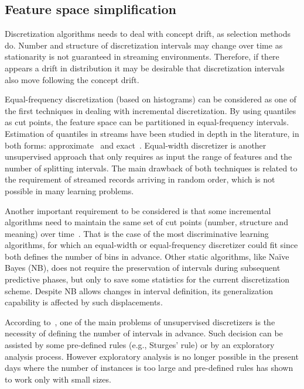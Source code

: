 \documentclass[preprint,12pt]{elsarticle}
\begin{document}
\subsection{Feature space simplification}
\label{subsec:disc}

Discretization algorithms needs to deal with concept drift, as selection methods do. Number and structure of discretization intervals may change over time as stationarity is not guaranteed in streaming environments. Therefore, if there appears a drift in distribution it may be desirable that discretization intervals also move following the concept drift.

Equal-frequency discretization (based on histograms) can be considered as one of the first techniques in dealing with incremental discretization. By using quantiles as cut points, the feature space can be partitioned in equal-frequency intervals. Estimation of quantiles in streams have been studied in depth in the literature, in both forms: approximate~\cite{ben10, webb14} and exact~\cite{gupta03, guha09}. Equal-width discretizer is another unsupervised approach that only requires as input the range of features and the number of splitting intervals. The main drawback of both techniques is related to the requirement of streamed records arriving in random order, which is not possible in many learning problems. 

Another important requirement to be considered is that some incremental algorithms need to maintain the same set of cut points (number, structure and meaning) over time~\cite{webb14}. That is the case of the most discriminative learning algorithms, for which an equal-width or equal-frequency discretizer could fit since both defines the number of bins in advance. Other static algorithms, like Na\"ive Bayes (NB), does not require the preservation of intervals during subsequent predictive phases, but only to save some statistics for the current discretization scheme. Despite NB allows changes in interval definition, its generalization capability is affected by such displacements.

According to~\cite{gama06}, one of the main problems of unsupervised discretizers is the necessity of defining the number of intervals in advance. Such decision can be assisted by some pre-defined rules (e.g., Sturges' rule) or by an exploratory analysis process. However exploratory analysis is no longer possible in the present days where the number of instances is too large and pre-defined rules has shown to work only with small sizes.
\end{document}
